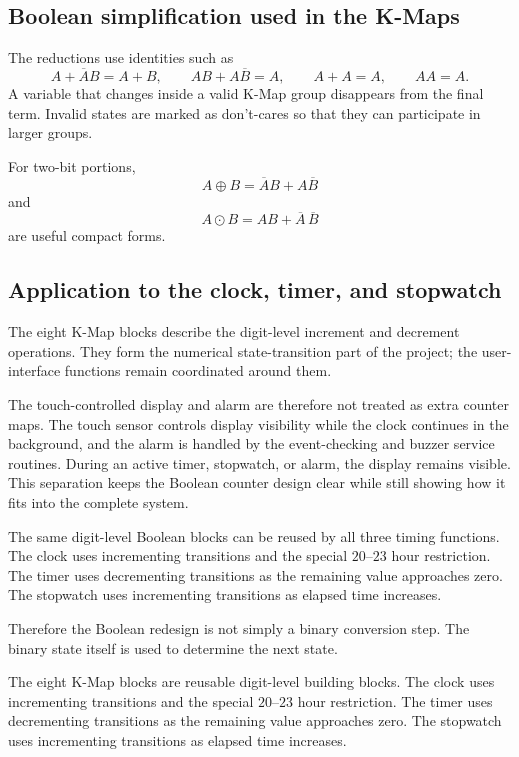 \documentclass[12pt,letterpaper]{article}
\begin{document}
\subsection{Boolean simplification used in the K-Maps}

The reductions use identities such as
\[
A+\overline{A}B=A+B,\qquad
AB+A\overline{B}=A,\qquad
A+A=A,\qquad AA=A.
\]
A variable that changes inside a valid K-Map group disappears from the final
term. Invalid states are marked as don't-cares so that they can participate
in larger groups.

For two-bit portions,
\[
A\oplus B=\overline AB+A\overline B
\]
and
\[
A\odot B=AB+\overline A\,\overline B
\]
are useful compact forms.

\subsection{Application to the clock, timer, and stopwatch}

The eight K-Map blocks describe the digit-level increment and decrement
operations. They form the numerical state-transition part of the project;
the user-interface functions remain coordinated around them.

The touch-controlled display and alarm are therefore not treated as extra
counter maps. The touch sensor controls display visibility while the clock
continues in the background, and the alarm is handled by the event-checking
and buzzer service routines. During an active timer, stopwatch, or alarm, the
display remains visible. This separation keeps the Boolean counter design
clear while still showing how it fits into the complete system.

The same digit-level Boolean blocks can be reused by all three timing
functions. The clock uses incrementing transitions and the special \(20\)--\(23\)
hour restriction. The timer uses decrementing transitions as the remaining
value approaches zero. The stopwatch uses incrementing transitions as elapsed
time increases.

Therefore the Boolean redesign is not simply a binary conversion step.
The binary state itself is used to determine the next state.

The eight K-Map blocks are reusable digit-level building blocks. The clock
uses incrementing transitions and the special \(20\)--\(23\) hour restriction.
The timer uses decrementing transitions as the remaining value approaches
zero. The stopwatch uses incrementing transitions as elapsed time increases.
\end{document}

